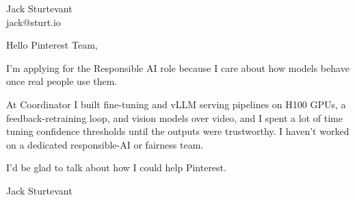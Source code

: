 \documentclass[11pt]{article}
\begin{document}
\raggedright

{\namefont\fontsize{20pt}{24pt}\selectfont Jack Sturtevant}\\[-0.3em]
jack@sturt.io

\vspace{1.2em}

Hello Pinterest Team,

I'm applying for the Responsible AI role because I care about how models behave once real people use them.

At Coordinator I built fine-tuning and vLLM serving pipelines on H100 GPUs, a feedback-retraining loop, and vision models over video, and I spent a lot of time tuning confidence thresholds until the outputs were trustworthy. I haven't worked on a dedicated responsible-AI or fairness team.

I'd be glad to talk about how I could help Pinterest.

\vspace{0.6em}
Jack Sturtevant
\end{document}
